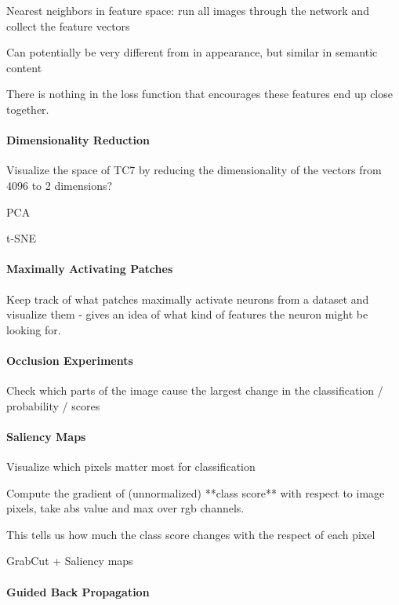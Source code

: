 Nearest neighbors in feature space:  run all images through the network and collect the feature vectors

Can potentially be very different from in appearance, but similar in semantic content

There is nothing in the loss function that encourages these features end up close together.

\paragraph{Dimensionality Reduction}

Visualize the space of TC7 by reducing the dimensionality of the vectors from 4096 to 2 dimensions?

PCA

t-SNE

\paragraph{Maximally Activating Patches}

Keep track of what patches maximally activate neurons from a dataset and visualize them - gives an idea of what kind of features the neuron might be looking for.

\paragraph{Occlusion Experiments}

Check which parts of the image cause the largest change in the classification / probability / scores

\paragraph{Saliency Maps}

Visualize which pixels matter most for classification

Compute the gradient of (unnormalized) **class score** with respect to image pixels, take abs value and max over rgb channels.

This tells us how much the class score changes with the respect of each pixel

GrabCut + Saliency maps

\paragraph{Guided Back Propagation}

